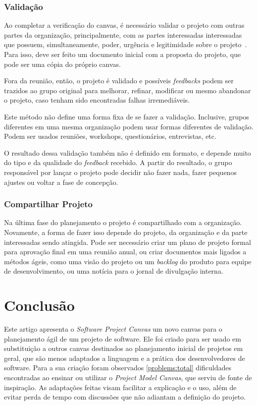 \documentclass[fontsize=12pt, a4paper,pagesize=auto,toc=listof, ,twoside,chapterprefix=false,appendixprefix=true,open=right]{scrbook}
\begin{document}
\subsection{Validação}

Ao completar a verificação do canvas, é necessário validar o projeto com outras partes da organização, principalmente, com as partes interessadas interessadas que possuem, simultaneamente, poder, urgência e legitimidade sobre o projeto~\citep{mitchell_toward_1997}. Para isso, deve ser feito um documento inicial com a proposta do projeto, que pode ser uma cópia do próprio canvas.

Fora da reunião, então, o projeto é validado e possíveis \textit{feedbacks} podem ser trazidos ao grupo original para melhorar, refinar, modificar ou mesmo abandonar o projeto, caso tenham sido encontradas falhas irremediáveis.


Este método não define uma forma fixa de se fazer a validação. Inclusive, grupos diferentes em uma mesma organização podem usar formas diferentes de validação. Podem ser usados reuniões, workshops, questionários, entrevistas, etc.

O resultado dessa validação também não é definido em formato, e depende muito do tipo e da qualidade do \textit{feedback} recebido. A partir do resultado, o grupo responsável por lançar o projeto pode decidir não fazer nada, fazer pequenos ajustes ou voltar a fase de concepção.

\subsection{Compartilhar Projeto}

Na última fase do planejamento o projeto é compartilhado com a organização. Novamente, a forma de fazer isso depende do projeto, da organização e da parte interessadas sendo atingida.  Pode ser necessário criar um plano de projeto formal para aprovação final em uma reunião anual, ou criar documentos mais ligados a métodos ágeis, como uma  visão do projeto ou um \textit{backlog} do produto para equipe de desenvolvimento, ou uma notícia para o jornal de divulgação interna.






\chapter{Conclusão}

Este artigo apresenta o \textit{Software Project Canvas} um novo canvas para o planejamento ágil de um projeto de software. Ele foi criado para ser usado em substituição a outros canvas destinados ao planejamento inicial de projetos em geral, que são menos adaptados a linguagem e a prática dos desenvolvedores de software. Para a sua  criação foram observados \ref{problems:total} dificuldades encontradas ao ensinar ou utilizar o \textit{Project Model Canvas}, que serviu de fonte de inspiração. As adaptações feitas visam facilitar a explicação e o uso, além de evitar perda de tempo com discussões que não adiantam a definição do projeto.
\end{document}
